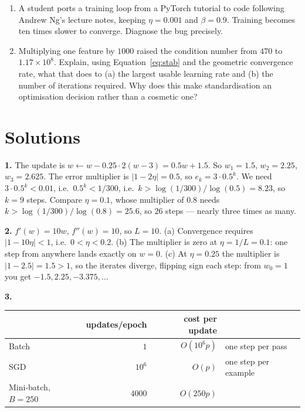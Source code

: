 \documentclass[11pt]{article}
\begin{document}
\begin{enumerate}[leftmargin=*]
  \item A student ports a training loop from a PyTorch tutorial to code
    following Andrew Ng's lecture notes, keeping $\eta = 0.001$ and
    $\beta = 0.9$. Training becomes ten times slower to converge. Diagnose the
    bug precisely.

  \item Multiplying one feature by $1000$ raised the condition number from
    $470$ to $1.17 \times 10^8$. Explain, using Equation~\eqref{eq:stab} and
    the geometric convergence rate, what that does to (a) the largest usable
    learning rate and (b) the number of iterations required. Why does this make
    standardisation an optimisation decision rather than a cosmetic one?
\end{enumerate}

\newpage
\section{Solutions}
\label{sec:solutions}

\textbf{1.} The update is $w \leftarrow w - 0.25 \cdot 2(w-3) = 0.5w + 1.5$.
So $w_1 = 1.5$, $w_2 = 2.25$, $w_3 = 2.625$. The error multiplier is
$\lvert 1-2\eta\rvert = 0.5$, so $e_k = 3 \cdot 0.5^k$. We need
$3 \cdot 0.5^k < 0.01$, i.e.\ $0.5^k < 1/300$, i.e.\
$k > \log(1/300)/\log(0.5) = 8.23$, so $k = 9$ steps. Compare $\eta = 0.1$,
whose multiplier of $0.8$ needs $k > \log(1/300)/\log(0.8) = 25.6$, so $26$
steps --- nearly three times as many.

\medskip
\textbf{2.} $f'(w) = 10w$, $f''(w) = 10$, so $L = 10$.
(a) Convergence requires $\lvert 1 - 10\eta\rvert < 1$, i.e.\
$0 < \eta < 0.2$. (b) The multiplier is zero at $\eta = 1/L = 0.1$: one step
from anywhere lands exactly on $w = 0$. (c) At $\eta = 0.25$ the multiplier is
$\lvert 1-2.5\rvert = 1.5 > 1$, so the iterates diverge, flipping sign each
step: from $w_0 = 1$ you get $-1.5, 2.25, -3.375, \dots$

\medskip
\textbf{3.}

\begin{center}
\begin{tabular}{@{}lrrl@{}}
\toprule
& updates/epoch & cost per update & \\
\midrule
Batch      & $1$         & $O(10^6 p)$ & one step per pass\\
SGD        & $10^6$      & $O(p)$      & one step per example\\
Mini-batch, $B{=}250$ & $4000$ & $O(250 p)$ & \\
\bottomrule
\end{tabular}
\end{center}
\end{document}
